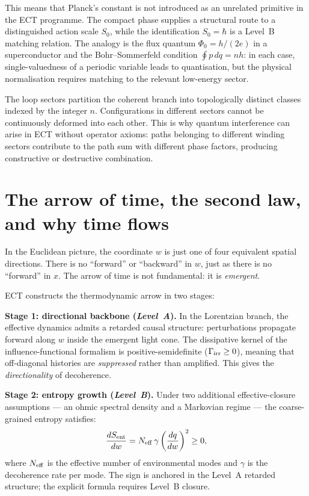 \documentclass[11pt,a4paper]{article}
\begin{document}
This means that Planck's constant is not introduced as an unrelated primitive in the ECT programme. The compact phase supplies a structural route to a distinguished action scale $S_0$, while the identification $S_0=\hbar$ is a Level~B matching relation. The analogy is the flux quantum $\Phi_0=h/(2e)$ in a superconductor and the Bohr--Sommerfeld condition $\oint p\,dq=nh$: in each case, single-valuedness of a periodic variable leads to quantisation, but the physical normalisation requires matching to the relevant low-energy sector.

The loop sectors partition the coherent branch into topologically distinct classes indexed by the integer $n$. Configurations in different sectors cannot be continuously deformed into each other. This is why quantum interference can arise in ECT without operator axioms: paths belonging to different winding sectors contribute to the path sum with different phase factors, producing constructive or destructive combination.


\section{The arrow of time, the second law, and why time flows}
\label{sec:pop_arrow}

In the Euclidean picture, the coordinate $w$ is just one of four equivalent spatial directions. There is no ``forward'' or ``backward'' in $w$, just as there is no ``forward'' in $x$. The arrow of time is not fundamental: it is \emph{emergent}.

ECT constructs the thermodynamic arrow in two stages:

\textbf{Stage 1: directional backbone (\emph{Level~A}).} In the Lorentzian branch, the effective dynamics admits a retarded causal structure: perturbations propagate forward along $w$ inside the emergent light cone. The dissipative kernel of the influence-functional formalism is positive-semidefinite ($\Gamma_{\rm irr} \geq 0$), meaning that off-diagonal histories are \emph{suppressed} rather than amplified. This gives the \emph{directionality} of decoherence.

\textbf{Stage 2: entropy growth (\emph{Level~B}).} Under two additional effective-closure assumptions --- an ohmic spectral density and a Markovian regime --- the coarse-grained entropy satisfies:
\begin{equation}
  \frac{dS_{\rm ent}}{dw} = N_{\rm eff}\,\gamma
  \left(\frac{dq}{dw}\right)^2 \geq 0,
  \label{eq:pop_2ndlaw}
\end{equation}
where $N_{\rm eff}$ is the effective number of environmental modes and $\gamma$ is the decoherence rate per mode. The sign is anchored in the Level~A retarded structure; the explicit formula requires Level~B closure.
\end{document}
